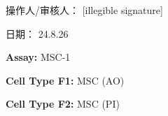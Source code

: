 \documentclass[UTF8,10pt,a4paper,fontset=fandol]{ctexart}
\newcommand{\fieldvalue}[1]{#1}
\newcommand{\handwritten}[1]{#1}
\begin{document}
\vspace{1.2em}

\noindent
\begin{minipage}[t]{0.48\textwidth}
\centering
\fbox{\rule{0pt}{0.25\textwidth}\rule{0.9\linewidth}{0pt}}
\end{minipage}
\hfill
\begin{minipage}[t]{0.48\textwidth}
\centering
\fbox{\rule{0pt}{0.25\textwidth}\rule{0.9\linewidth}{0pt}}
\end{minipage}

\vspace{1em}

\noindent
\begin{minipage}[t]{0.48\textwidth}
\centering
\fbox{\rule{0pt}{0.28\textwidth}\rule{0.9\linewidth}{0pt}}
\end{minipage}
\hfill
\begin{minipage}[t]{0.48\textwidth}
\centering
\fbox{\rule{0pt}{0.28\textwidth}\rule{0.9\linewidth}{0pt}}
\end{minipage}

\vfill

\noindent
操作人/审核人：
\fieldvalue{\handwritten{[illegible signature]}}

\hfill
日期：
\fieldvalue{\handwritten{24.8.26}}

\newpage

\noindent\textbf{Assay: }
\fieldvalue{MSC-1}

\vspace{0.8em}

\noindent\textbf{Cell Type F1: }
\fieldvalue{MSC (AO)}

\noindent\textbf{Cell Type F2: }
\fieldvalue{MSC (PI)}
\end{document}
